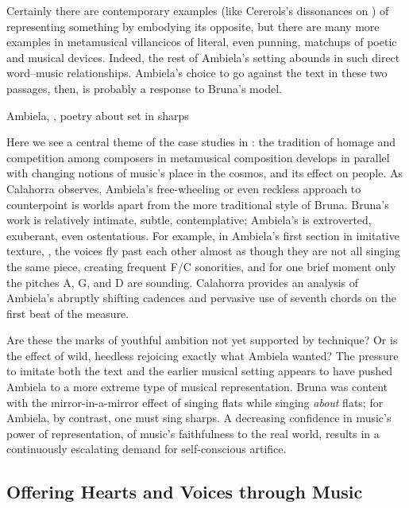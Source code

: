 Certainly there are contemporary examples (like Cererols's dissonances on
) of representing something by embodying its
opposite, but there are many more examples in metamusical villancicos of
literal, even punning, matchups of poetic and musical devices. 
Indeed, the rest of Ambiela's setting abounds in such direct word--music
relationships.
Ambiela's choice to go against the text in these two passages, then, is
probably a response to Bruna's model.

{Ambiela, , poetry about  set in sharps}

Here we see a central theme of the case studies in
: the tradition of homage and competition among
composers in metamusical composition develops in parallel with changing notions
of music's place in the cosmos, and its effect on people.
As Calahorra observes, Ambiela's free-wheeling or even reckless approach to
counterpoint is worlds apart from the more traditional style of Bruna.
Bruna's work is relatively intimate, subtle, contemplative; Ambiela's is
extroverted, exuberant, even ostentatious.
For example, in Ambiela's first section in imitative texture, ,
the voices fly past each other almost as though they are not all singing the
same piece, creating frequent F\na{}/C\sh{} sonorities, and for one brief
moment only the pitches A, G, and D are sounding.
Calahorra provides an analysis of Ambiela's abruptly shifting cadences and
pervasive use of seventh chords on the first beat of the measure.

Are these the marks of youthful ambition not yet supported by technique?
Or is the effect of wild, heedless rejoicing exactly what Ambiela wanted?
The pressure to imitate both the text and the earlier musical setting appears
to have pushed Ambiela to a more extreme type of musical representation.
Bruna was content with the mirror-in-a-mirror effect of singing flats while
singing \emph{about} flats; for Ambiela, by contrast, one must sing sharps.
A decreasing confidence in music's power of representation, of music's
faithfulness to the real world, results in a continuously escalating demand for
self-conscious artifice.  


\subsection{Offering Hearts and Voices through Music}

